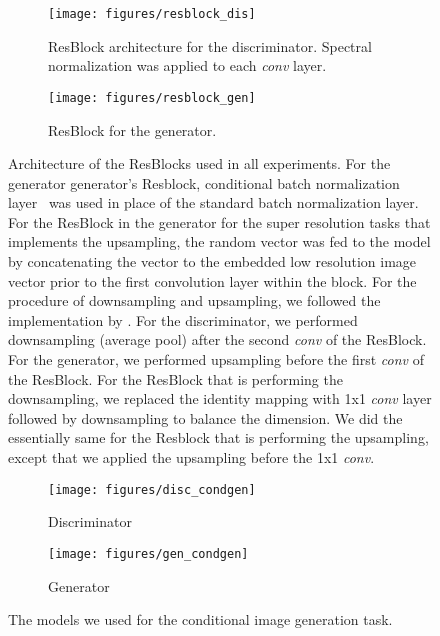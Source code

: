 \documentclass{article}
\begin{document}
\begin{figure}[ht]
    \centering
    \begin{subfigure}[ht]{0.3\textwidth}
        \texttt{[image: figures/resblock\_dis]}
        \caption{\label{subfig:resblock_dis}
        ResBlock architecture for the discriminator. 
        Spectral normalization \cite[]{miyato2018spectral} was applied to each \textit{conv} layer.}
    \end{subfigure}\hspace{2cm}
    \begin{subfigure}[ht]{0.3\textwidth}
        \texttt{[image: figures/resblock\_gen]}
        \caption{\label{subfig:resblock_gen}
        ResBlock for the generator. 
             }
    \end{subfigure}
    \caption{\label{fig:resblocks} 
    Architecture of the ResBlocks used in all experiments.
    For the generator generator's Resblock, conditional batch normalization layer~\cite[]{dumoulin2016learned, de2017modulating} was used in place of the standard batch normalization layer.  
    For the ResBlock in the generator for the super resolution tasks that implements the upsampling, the random vector  was fed to the model by concatenating the vector to the embedded low resolution image vector  prior to the first convolution layer within the block.
    For the procedure of downsampling and upsampling, we followed the implementation by \cite{gulrajani2017improved}. 
    For the discriminator, we performed downsampling  (average pool) after the second \textit{conv} of the ResBlock.
    For the generator, we performed upsampling before the first \textit{conv} of the ResBlock.
    For the ResBlock that is performing the downsampling,  we  replaced the identity mapping with 1x1 \textit{conv} layer followed by downsampling to balance the dimension.  
    We did the essentially same for the Resblock that is performing the upsampling, except that we applied the upsampling before the 1x1 \textit{conv}.} 
\end{figure}

\begin{figure}[ht]
    \centering
    \begin{subfigure}{0.45\textwidth}
        \texttt{[image: figures/disc\_condgen]}
        \caption{\label{fig:resnets_condgen_dis}Discriminator}
    \end{subfigure}
    \begin{subfigure}{0.35\textwidth}
        \texttt{[image: figures/gen\_condgen]}
        \caption{\label{fig:resnets_condgen_gen}Generator}
    \end{subfigure}
    \caption{\label{fig:resnets_condgen}The models we used for the conditional image generation task.}
\end{figure}
\end{document}
